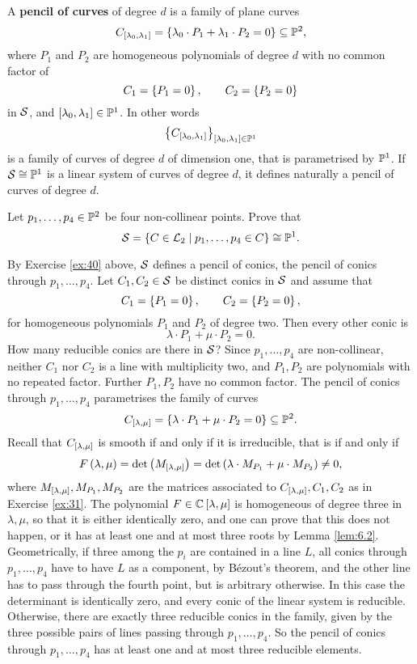 \begin{definition}
A \textbf{pencil of curves} of degree $ d $ is a family of plane curves
$$ C_{\sb{\lambda_0, \lambda_1}} = \cb{\lambda_0 \cdot P_1 + \lambda_1 \cdot P_2 = 0} \subseteq \P^2, $$
where $ P_1 $ and $ P_2 $ are homogeneous polynomials of degree $ d $ with no common factor of
$$ C_1 = \cb{P_1 = 0}, \qquad C_2 = \cb{P_2 = 0} $$
in $ \SS $, and $ \sb{\lambda_0, \lambda_1} \in \P^1 $. In other words
$$ \cb{C_{\sb{\lambda_0, \lambda_1}}}_{\sb{\lambda_0, \lambda_1} \in \P^1} $$
is a family of curves of degree $ d $ of dimension one, that is parametrised by $ \P^1 $. If $ \SS \cong \P^1 $ is a linear system of curves of degree $ d $, it defines naturally a pencil of curves of degree $ d $.
\end{definition}

\begin{exercise}
\label{ex:40}
Let $ p_1, \dots, p_4 \in \P^2 $ be four non-collinear points. Prove that
$$ \SS = \cb{C \in \LL_2 \mid p_1, \dots, p_4 \in C} \cong \P^1. $$
\end{exercise}

\begin{example}
By Exercise \ref{ex:40} above, $ \SS $ defines a pencil of conics, the pencil of conics through $ p_1, \dots, p_4 $. Let $ C_1, C_2 \in \SS $ be distinct conics in $ \SS $ and assume that
$$ C_1 = \cb{P_1 = 0}, \qquad C_2 = \cb{P_2 = 0}, $$
for homogeneous polynomials $ P_1 $ and $ P_2 $ of degree two. Then every other conic is
$$ \lambda \cdot P_1 + \mu \cdot P_2 = 0. $$
How many reducible conics are there in $ \SS $? Since $ p_1, \dots, p_4 $ are non-collinear, neither $ C_1 $ nor $ C_2 $ is a line with multiplicity two, and $ P_1, P_2 $ are polynomials with no repeated factor. Further $ P_1, P_2 $ have no common factor. The pencil of conics through $ p_1, \dots, p_4 $ parametrises the family of curves
$$ C_{\sb{\lambda, \mu}} = \cb{\lambda \cdot P_1 + \mu \cdot P_2 = 0} \subseteq \P^2. $$
Recall that $ C_{\sb{\lambda, \mu}} $ is smooth if and only if it is irreducible, that is if and only if
$$ F\rb{\lambda, \mu} = \det\rb{M_{\sb{\lambda, \mu}}} = \det\rb{\lambda \cdot M_{P_1} + \mu \cdot M_{P_2}} \ne 0, $$
where $ M_{\sb{\lambda, \mu}}, M_{P_1}, M_{P_2} $ are the matrices associated to $ C_{\sb{\lambda, \mu}}, C_1, C_2 $ as in Exercise \ref{ex:31}. The polynomial $ F \in \C\sb{\lambda, \mu} $ is homogeneous of degree three in $ \lambda, \mu $, so that it is either identically zero, and one can prove that this does not happen, or it has at least one and at most three roots by Lemma \ref{lem:6.2}. Geometrically, if three among the $ p_i $ are contained in a line $ L $, all conics through $ p_1, \dots, p_4 $ have to have $ L $ as a component, by B\'ezout's theorem, and the other line has to pass through the fourth point, but is arbitrary otherwise. In this case the determinant is identically zero, and every conic of the linear system is reducible. Otherwise, there are exactly three reducible conics in the family, given by the three possible pairs of lines passing through $ p_1, \dots, p_4 $. So the pencil of conics through $ p_1, \dots, p_4 $ has at least one and at most three reducible elements.
\end{example}

